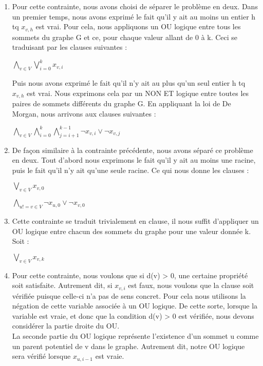 \documentclass[a4paper]{article}
\begin{document}
\begin{enumerate}
\item
Pour cette contrainte, nous avons choisi de séparer le problème en deux.
Dans un premier temps, nous avons exprimé le fait qu'il y ait au moins un entier
h tq $x_{v, h}$ est vrai. Pour cela, nous appliquons un OU logique entre tous les
sommets du graphe G et ce, pour chaque valeur allant de 0 à k. Ceci se traduisant
par les clauses suivantes :
\begin{center}
$\bigwedge\limits_{v∈V}^{} \bigvee\limits_{i=0}^{k} x_{v,i}$
\end{center}

Puis nous avons exprimé le fait qu'il n'y ait au plus qu'un seul entier h tq
$x_{v, h}$ est vrai. Nous exprimons cela par un NON ET logique entre toutes les
paires de sommets différents du graphe G. En appliquant la loi de De Morgan, nous
arrivons aux clauses suivantes :
\begin{center}
$\bigwedge\limits_{v∈V}^{} \bigwedge\limits_{i=0}^{k} \bigwedge\limits_{j=i+1}^{k-1} \neg x_{v,i} \vee \neg x_{v,j} $
\end{center}

\item
De façon similaire à la contrainte précédente, nous avons séparé ce problème en
deux. Tout d'abord nous exprimons le fait qu'il y ait au moins une racine, puis
le fait qu'il n'y ait qu'une seule racine. Ce qui nous donne les clauses : \\
\begin{center}
$\bigvee\limits_{v∈V}^{} x_{v,0} $
\end{center}

\begin{center}
$\bigwedge\limits_{u!=v∈V}^{} \neg x_{u,0} \vee \neg x_{v,0}$
\end{center}

\item
Cette contrainte se traduit trivialement en clause, il nous suffit d'appliquer
un OU logique entre chacun des sommets du graphe pour une valeur donnée k.
Soit : \\
\begin{center}
$\bigvee\limits_{v∈V}^{} x_{v,k} $
\end{center}

\item
Pour cette contrainte, nous voulons que si d(v) > 0, une certaine propriété soit
satisfaite. Autrement dit, si $x_{v, i}$ est faux, nous voulons que la clause
soit vérifiée puisque celle-ci n'a pas de sens concret. Pour cela nous utilisons
la négation de cette variable associée à un OU logique. De cette sorte, lorsque
la variable est vraie, et donc que la condition d(v) > 0 est vérifiée, nous devons
considérer la partie droite du OU. \\
La seconde partie du OU logique représente l'existence d'un sommet u comme un
parent potentiel de v dans le graphe. Autrement dit, notre OU logique sera
vérifié lorsque $x_{u, i-1}$ est vraie.


\end{enumerate}
\end{document}
